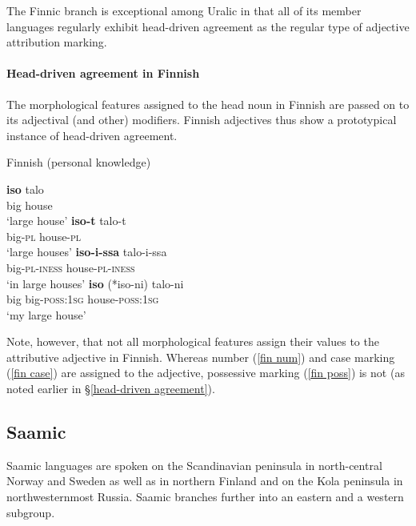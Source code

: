 The Finnic branch is exceptional among Uralic in that all of its member languages regularly exhibit head\hyp{}driven agreement as the regular type of adjective attribution marking.

\paragraph*{Head\hyp{}driven agreement in Finnish}
\label{finnish synchr}
The morphological features assigned to the head noun in Finnish are passed on to its adjectival (and other) modifiers. Finnish adjectives thus show a prototypical instance of head\hyp{}driven agreement. 
\begin{exe}
\ex \rm{Finnish (personal knowledge)}
\begin{xlist}
\ex
\gll	\textbf{iso} talo\\
	big house\\
\glt	‘large house’
\label{fin num}
\ex \gll	\textbf{iso-t} talo-t\\
	big-\textsc{pl} house-\textsc{pl}\\
\glt	‘large houses’
\ex \label{fin case}
\gll	\textbf{iso-i-ssa}	talo-i-ssa\\
	big-\textsc{pl}-\textsc{iness} house-\textsc{pl}-\textsc{iness}\\
\glt	‘in large houses’
\label{fin poss}
\ex 	
\gll	\textbf{iso} {(*iso-ni)} talo-ni\\
	big big-\textsc{poss:1sg} house-\textsc{poss:1sg}\\
\glt	‘my large house’
\end{xlist}
\end{exe}
Note, however, that not all morphological features assign their values to the attributive adjective in Finnish. Whereas number (\ref{fin num}) and case marking (\ref{fin case}) are assigned to the adjective, possessive marking (\ref{fin poss}) is not (as noted earlier in \S\ref{head-driven agreement}).

\subsection{Saamic}\label{saami synchr}
Saamic languages are spoken on the Scandinavian peninsula in north-central Norway and Sweden as well as in northern Finland and on the Kola peninsula in northwesternmost Russia. Saamic branches further into an eastern and a western subgroup.

